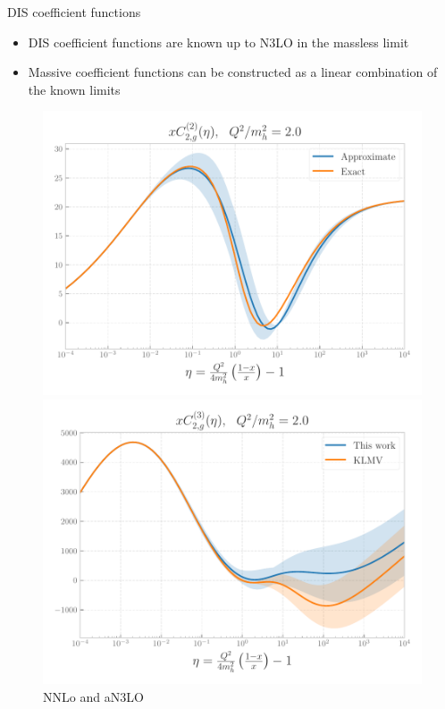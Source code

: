\documentclass[aspectratio=169, 9pt,t]{beamer}
\begin{document}
\begin{frame}{DIS coefficient functions}
  \begin{itemize}
    \item DIS coefficient functions are known up to N3LO in the massless limit
    \item Massive coefficient functions can be constructed as a linear combination of the known limits
  \end{itemize}

  \begin{figure}[!t]
    \centering
    \includegraphics[width=.49\textwidth]{figures/C2g_2_Q2m2_2.0.pdf}
    \includegraphics[width=.49\textwidth]{figures/C2g_3_Q2m2_2.0.pdf}
    NNLo and aN3LO
  \end{figure}
\end{frame}
\end{document}
